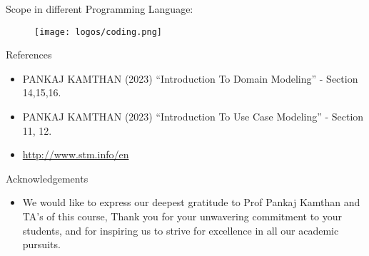 \documentclass[final]{beamer}
\newlength{\onecolwid}
\begin{document}
\begin{frame}[t]
\begin{columns}[t]
\begin{column}{\onecolwid}
\begin{block}{Scope in different Programming Language:}
\begin{figure}[h!]
  \centering
   \texttt{[image: logos/coding.png]}
\end{figure}
\begin{alertblock}{ }
    
\end{alertblock}
\end{block}


\begin{block}{References}

\begin{alertblock} { }
    \begin{itemize}
        \item PANKAJ KAMTHAN (2023) “Introduction To Domain Modeling” - Section 14,15,16.
        \item PANKAJ KAMTHAN (2023) “Introduction To Use Case Modeling” - Section 11, 12.
        \item \url{http://www.stm.info/en}
    \end{itemize}

\end{alertblock}
\end{block}

\begin{block}{Acknowledgements}
\begin{alertblock}{ }
    \begin{itemize}
        \item We would like to express our deepest gratitude to Prof Pankaj Kamthan and TA's of this course, Thank you for your unwavering commitment to your students, and for inspiring us to strive for excellence in all our academic pursuits.\\
    \end{itemize}
\end{alertblock}

\end{block}




\end{column} %

\end{columns} %

\end{frame} %
\end{document}
